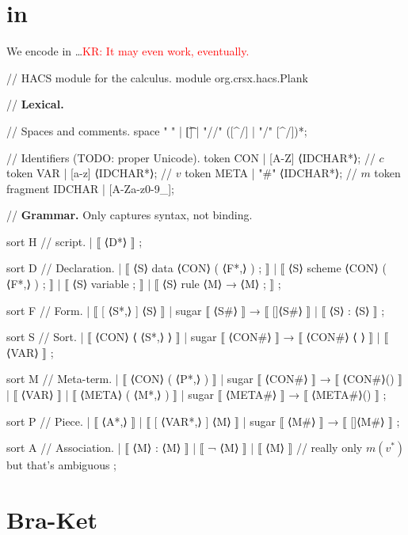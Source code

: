 \documentclass[letterpaper,11pt]{article}
\newcommand{\KR}[1]{\textcolor{red}{KR: #1}}
\begin{document}
\appendix

\section{\bhax in \HAX}

We encode \hax in \HAX…\KR{It may even work, eventually.}
%
\begin{hacs}[numbers=right,texcl]
// HACS module for the \hax calculus.
module org.crsx.hacs.Plank {

// \textbf{Lexical.}

// Spaces and comments.
space " " | [\t\n] | "//" ([^/\n] | "/" [^/\n])*;

// Identifiers (TODO: proper Unicode).
token CON   | [A-Z] ⟨IDCHAR*⟩;   // $c$
token VAR   | [a-z] ⟨IDCHAR*⟩;    // $v$
token META  | "#" ⟨IDCHAR*⟩;     // $m$
token fragment IDCHAR | [A-Za-z0-9_];

// \textbf{Grammar.} Only captures syntax, not binding.

sort H // \hax script.
| ⟦ ⟨D*⟩ ⟧
;

sort D // Declaration.
| ⟦ ⟨S⟩ data ⟨CON⟩ ( ⟨F*,⟩ ) ; ⟧
| ⟦ ⟨S⟩ scheme ⟨CON⟩ ( ⟨F*,⟩ ) ; ⟧
| ⟦ ⟨S⟩ variable ; ⟧
| ⟦ ⟨S⟩ rule ⟨M⟩ → ⟨M⟩ ; ⟧
;

sort F // Form.
| ⟦ [ ⟨S*,⟩ ] ⟨S⟩ ⟧  | sugar ⟦ ⟨S#⟩ ⟧ → ⟦ []⟨S#⟩ ⟧
| ⟦ { ⟨S⟩ : ⟨S⟩ } ⟧
;


sort S // Sort.
| ⟦ ⟨CON⟩ ⟨ ⟨S*,⟩ ⟩ ⟧  | sugar ⟦ ⟨CON#⟩ ⟧ → ⟦ ⟨CON#⟩ ⟨ ⟩ ⟧
| ⟦ ⟨VAR⟩ ⟧
;

sort M // Meta-term.
| ⟦ ⟨CON⟩ ( ⟨P*,⟩ ) ⟧  | sugar ⟦ ⟨CON#⟩ ⟧ → ⟦ ⟨CON#⟩() ⟧
| ⟦ ⟨VAR⟩ ⟧
| ⟦ ⟨META⟩ ( ⟨M*,⟩ ) ⟧  | sugar ⟦ ⟨META#⟩ ⟧ → ⟦ ⟨META#⟩() ⟧
;

sort P // Piece.
| ⟦ { ⟨A*,⟩ } ⟧
| ⟦ [ ⟨VAR*,⟩ ] ⟨M⟩ ⟧   | sugar ⟦ ⟨M#⟩ ⟧ → ⟦ []⟨M#⟩ ⟧
;

sort A // Association.
| ⟦ ⟨M⟩ : ⟨M⟩ ⟧
| ⟦ ¬ ⟨M⟩ ⟧
| ⟦ ⟨M⟩ ⟧  // really only $m(v^*)$ but that's ambiguous
;

}
\end{hacs}


\section{Bra-Ket}
\end{document}
